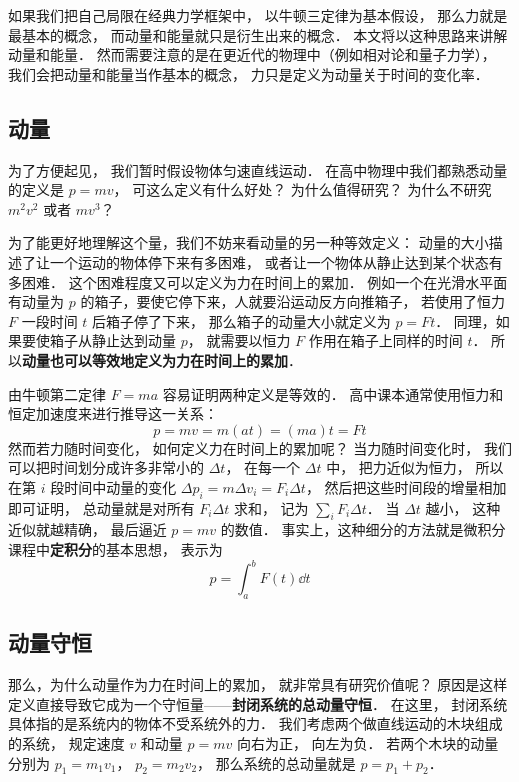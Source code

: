
\begin{issues}
\issueTODO
\end{issues}


如果我们把自己局限在经典力学框架中， 以牛顿三定律为基本假设， 那么力就是最基本的概念， 而动量和能量就只是衍生出来的概念． 本文将以这种思路来讲解动量和能量． 然而需要注意的是在更近代的物理中（例如相对论和量子力学）， 我们会把动量和能量当作基本的概念， 力只是定义为动量关于时间的变化率．

\subsection{动量}\label{CM1_sub1}
为了方便起见， 我们暂时假设物体匀速直线运动． 在高中物理中我们都熟悉动量的定义是 $p = mv$， 可这么定义有什么好处？ 为什么值得研究？ 为什么不研究 $m^2 v^2$ 或者 $mv^3$？



为了能更好地理解这个量，我们不妨来看动量的另一种等效定义： 动量的大小描述了让一个运动的物体停下来有多困难， 或者让一个物体从静止达到某个状态有多困难． 这个困难程度又可以定义为力在时间上的累加． 例如一个在光滑水平面有动量为 $p$ 的箱子，要使它停下来，人就要沿运动反方向推箱子， 若使用了恒力 $F$ 一段时间 $t$ 后箱子停了下来， 那么箱子的动量大小就定义为 $p = Ft$． 同理，如果要使箱子从静止达到动量 $p$， 就需要以恒力 $F$ 作用在箱子上同样的时间 $t$． 所以\textbf{动量也可以等效地定义为力在时间上的累加}．

由牛顿第二定律 $F = ma$ 容易证明两种定义是等效的． 高中课本通常使用恒力和恒定加速度来进行推导这一关系：
\begin{equation}
p = mv = m(at) = (ma)t = Ft
\end{equation}
然而若力随时间变化， 如何定义力在时间上的累加呢？ 当力随时间变化时， 我们可以把时间划分成许多非常小的 $\Delta t$， 在每一个 $\Delta t$ 中， 把力近似为恒力， 所以在第 $i$ 段时间中动量的变化 $\Delta p_i = m\Delta v_i = F_i\Delta t$， 然后把这些时间段的增量相加即可证明， 总动量就是对所有 $F_i\Delta t$ 求和， 记为 $\sum_i F_i \Delta t$． 当 $\Delta t$ 越小， 这种近似就越精确， 最后逼近 $p = mv$ 的数值． 事实上，这种细分的方法就是微积分课程中\textbf{定积分}的基本思想， 表示为
\begin{equation}
p = \int_a^b F(t)\dd{t}
\end{equation}

\subsection{动量守恒}
那么，为什么动量作为力在时间上的累加， 就非常具有研究价值呢？ 原因是这样定义直接导致它成为一个守恒量——\textbf{封闭系统的总动量守恒}． 在这里， 封闭系统具体指的是系统内的物体不受系统外的力． 我们考虑两个做直线运动的木块组成的系统， 规定速度 $v$ 和动量 $p = mv$ 向右为正， 向左为负． 若两个木块的动量分别为 $p_1 = m_1 v_1$， $p_2 = m_2 v_2$， 那么系统的总动量就是 $p = p_1 + p_2$．

